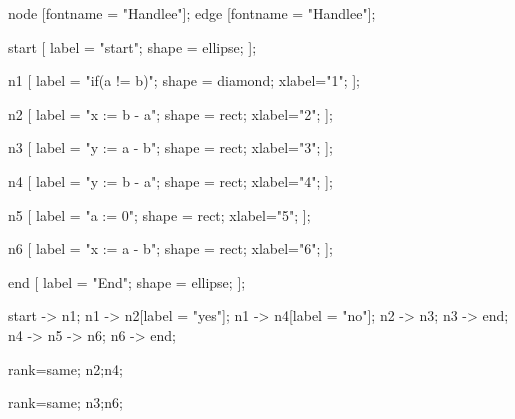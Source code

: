  {
node [fontname = "Handlee"];
edge [fontname = "Handlee"];

start [
 label = "start";
 shape = ellipse; 
];

n1 [
 label = "if(a != b)";
 shape = diamond;
 xlabel="1";
];

n2 [
 label = "x := b - a";
 shape = rect;
 xlabel="2";
];

n3 [
 label = "y := a - b";
 shape = rect;
 xlabel="3";
];

n4 [
 label = "y := b - a";
 shape = rect;
 xlabel="4";
];

n5 [
 label = "a := 0";
 shape = rect;
 xlabel="5";
];

n6 [
 label = "x := a - b";
 shape = rect;
 xlabel="6";
];

end [
 label = "End";
 shape = ellipse; 
];

start -> n1;
n1 -> n2[label = "yes"];
n1 -> n4[label = "no"];
n2 -> n3;
n3 -> end;
n4 -> n5 -> n6;
n6 -> end;


{
rank=same;
n2;n4;
}

{
rank=same;
n3;n6;
}

}